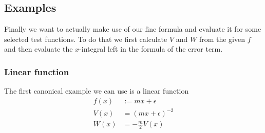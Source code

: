 \subsection{Examples}
Finally we want to actually make use of our fine formula and evaluate it for
some selected test functions. To do that we first calculate $V$ and $W$ from the
given $f$ and then evaluate the $x$-integral left in the formula of the error
term.

\subsubsection{Linear function}
The first canonical example we can use is a linear function
\begin{align}
  f(x) &:= mx + \epsilon \\
  V(x) &= (mx + \epsilon)^{-2} \\
  W(x) &= -\frac m 2 V(x)
\end{align}


